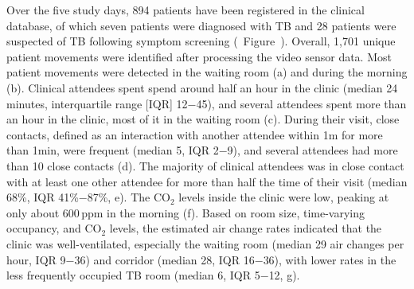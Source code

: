 \documentclass[fleqn,11pt]{wlscirep}
\begin{document}
Over the five study days, 894 patients have been registered in the clinical database, of which seven patients were diagnosed with TB and 28 patients were suspected of TB following symptom screening (\supp~Figure~). Overall, 1,701 unique patient movements were identified after processing the video sensor data. Most patient movements were detected in the waiting room (a) and during the morning (b). Clinical attendees spent spend around half an hour in the clinic (median 24 minutes, interquartile range [IQR] 12$-$45), and several attendees spent more than an hour in the clinic, most of it in the waiting room (c). During their visit, close contacts, defined as an interaction with another attendee within 1m for more than 1min, were frequent (median 5, IQR 2$-$9), and several attendees had more than 10 close contacts (d). The majority of clinical attendees was in close contact with at least one other attendee for more than half the time of their visit (median 68\%, IQR 41\%$-$87\%, e). The CO$_2$ levels inside the clinic were low, peaking at only about 600\,ppm in the morning (f). Based on room size, time-varying occupancy, and CO$_2$ levels, the estimated air change rates indicated that the clinic was well-ventilated, especially the waiting room (median 29 air changes per hour, IQR 9$-$36) and corridor (median 28, IQR 16$-$36), with lower rates in the less frequently occupied TB room (median 6, IQR 5$-$12, g). 
\end{document}

